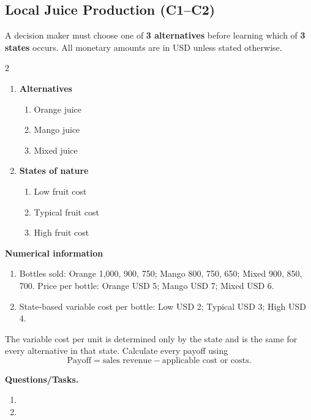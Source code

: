 \subsection{Local Juice Production (C1--C2)}
\label{sec:problem6-local-juice-production-c1-c2}
A decision maker must choose one of \textbf{3 alternatives} before learning which of \textbf{3 states} occurs. All monetary amounts are in USD unless stated otherwise.
\begin{multicols}{2}
\begin{enumerate}[label=\arabic*.]
 \item \textbf{Alternatives}
 \begin{enumerate}[label=\roman*)]
  \item Orange juice
  \item Mango juice
  \item Mixed juice
 \end{enumerate}
 \item \textbf{States of nature}
 \begin{enumerate}[label=\roman*)]
  \item Low fruit cost
  \item Typical fruit cost
  \item High fruit cost
 \end{enumerate}
\end{enumerate}
\end{multicols}
 \textbf{Numerical information}
 \begin{enumerate}[label=\roman*)]
  \item Bottles sold: Orange 1,000, 900, 750; Mango 800, 750, 650; Mixed 900, 850, 700. Price per bottle: Orange USD 5; Mango USD 7; Mixed USD 6.
  \item State-based variable cost per bottle: Low USD 2; Typical USD 3; High USD 4.
 \end{enumerate}
The variable cost per unit is determined only by the state and is the same for every alternative in that state. Calculate every payoff using
\[
 \text{Payoff}=\text{sales revenue}-\text{applicable cost or costs}.
\]

\textbf{Questions/Tasks.}
\begin{enumerate}[label=\textbf{\alph*)}]
 \item {}
 \item {}
\end{enumerate}
